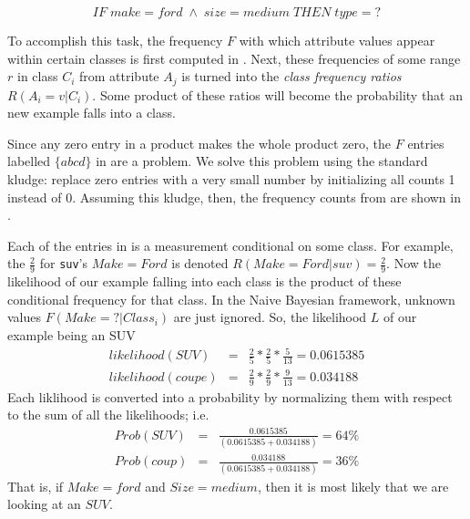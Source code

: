 \[
IF\;make=ford\;\wedge\;size=medium\;THEN\;type=?\]


To accomplish this task, the frequency $F$ with which attribute
values appear within certain classes is first computed in .
Next, these frequencies of some range $r$ in class $C_i$ from
attribute $A_j$ is  turned into the {\em class frequency ratios}
$R(A_i=v|C_i)$. Some product of these ratios will become the
probability that an new example falls into a class.

Since any zero entry in a product makes the whole product zero, the
$F$ entries labelled $\{abcd\}$ in  are a problem. We solve
this problem using the  standard kludge: replace zero entries with a
very small number by initializing all counts 1 instead of 0. Assuming
this kludge, then, the frequency counts from  are shown in
.

Each of the  entries in  is a measurement conditional on
some class. For example, the $\frac{2}{9}$ for {\tt suv}'s
$Make=Ford$ is denoted $R(Make=Ford|suv)=\frac{2}{9}$. Now the
likelihood of our example falling into each class is the product of
these conditional frequency for that class. In the Naive Bayesian
framework, unknown values $F(Make=?|Class_i)$ are just ignored. So,
the likelihood $L$ of our example being an SUV
\begin{eqnarray}\nonumber
likelihood(SUV) & =& \frac{2}{5}*\frac{2}{5}*\frac{5}{13}=
0.0615385\\\nonumber likelihood(coupe)&=&
\frac{2}{9}*\frac{2}{9}*\frac{9}{13}= 0.034188
\end{eqnarray}
Each liklihood is converted into a probability by normalizing them
with respect to the sum of all the likelihoods; i.e.
\begin{eqnarray}\nonumber
Prob(SUV) &= &\frac{0.0615385}{(0.0615385 + 0.034188)} = 64\%
\\\nonumber Prob(coup)&= &\frac{0.034188}{(0.0615385 + 0.034188)}  =
36\%
\end{eqnarray}
That is, if $Make=ford$ and  $Size=medium$, then it is most likely
that we are looking at an $SUV$.
